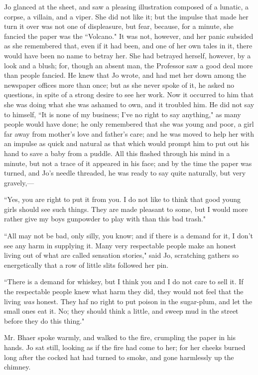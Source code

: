 Jo glanced at the sheet, and saw a pleasing illustration composed of a
lunatic, a corpse, a villain, and a viper. She did not like it; but the
impulse that made her turn it over was not one of displeasure, but fear,
because, for a minute, she fancied the paper was the ``Volcano." It was
not, however, and her panic subsided as she remembered that, even if it
had been, and one of her own tales in it, there would have been no name
to betray her. She had betrayed herself, however, by a look and a blush;
for, though an absent man, the Professor saw a good deal more than
people fancied. He knew that Jo wrote, and had met her down among the
newspaper offices more than once; but as she never spoke of it, he asked
no questions, in spite of a strong desire to see her work. Now it
occurred to him that she was doing what she was ashamed to own, and it
troubled him. He did not say to himself, ``It is none of my business;
I've no right to say anything," as many people would
have done; he only remembered that she was young and poor, a girl far
away from mother's love and father's
care; and he was moved to help her with an impulse as quick and natural
as that which would prompt him to put out his hand to save a baby from a
puddle. All this flashed through his mind in a minute, but not a trace
of it appeared in his face; and by the time the paper was turned, and
Jo's needle threaded, he was ready to say quite
naturally, but very gravely,---

``Yes, you are right to put it from you. I do not like to think that good
young girls should see such things. They are made pleasant to some, but
I would more rather give my boys gunpowder to play with than this bad
trash."

``All may not be bad, only silly, you know; and if there is a demand for
it, I don't see any harm in supplying it. Many very
respectable people make an honest living out of what are called
sensation stories," said Jo, scratching gathers so energetically that a
row of little slits followed her pin.

``There is a demand for whiskey, but I think you and I do not care to
sell it. If the respectable people knew what harm they did, they would
not feel that the living \emph{was} honest. They haf no right to put
poison in the sugar-plum, and let the small ones eat it. No; they should
think a little, and sweep mud in the street before they do this thing."

Mr. Bhaer spoke warmly, and walked to the fire, crumpling the paper in
his hands. Jo sat still, looking as if the fire had come to her; for her
cheeks burned long after the cocked hat had turned to smoke, and gone
harmlessly up the chimney.

